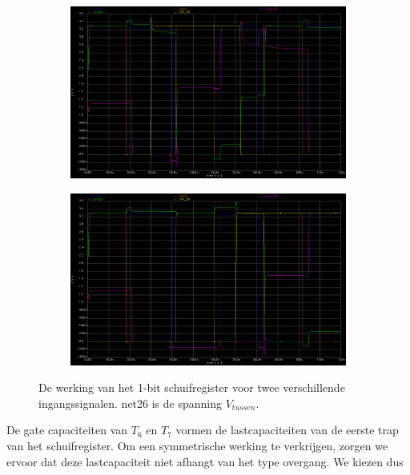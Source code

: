 \documentclass[11pt,a4paper,oneside,dutch]{article}
\begin{document}
\begin{figure}[htp]
	\centering
	\begin{subfigure}[b]{0.7\textwidth}
		\includegraphics[width=\textwidth]{wave_tussen1.png}
		\caption{}
		\label{fig:wave_tussen1}
	\end{subfigure}
	
	\vspace{1em}	
	
	\begin{subfigure}[b]{0.7\textwidth}
		\includegraphics[width=\textwidth]{wave_tussen2.png}
		\caption{}
		\label{fig:wave_tussen2}
	\end{subfigure}
	\caption{De werking van het 1-bit schuifregister voor twee verschillende ingangssignalen. net26 is de spanning $V_{tussen}$.}
	\label{fig:wave_tussen}
\end{figure}

De gate capaciteiten van $T_6$ en $T_7$ vormen de lastcapaciteiten van de eerste trap van het schuifregister. Om een symmetrische werking te verkrijgen, zorgen we ervoor dat deze lastcapaciteit niet afhangt van het type overgang. We kiezen dus
\end{document}
